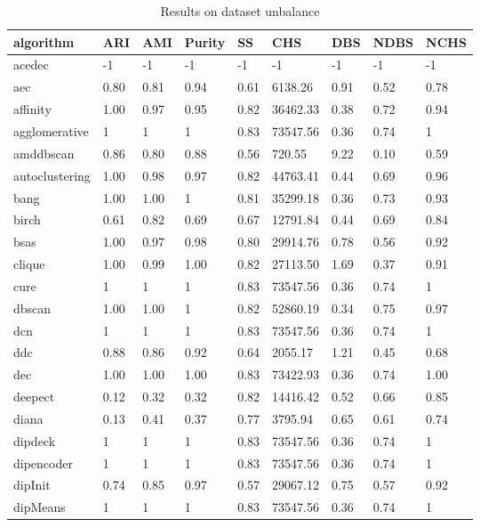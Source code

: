 \begin{table}[H]
\centering
\caption{Results on dataset unbalance}
\label{tab:params:unbalance}
\begin{tabular}{|l|l|l|l|l|l|l|l|l|}
\hline
algorithm & ARI & AMI & Purity & SS & CHS & DBS & NDBS & NCHS \\
\hline
acedec & -1 & -1 & -1 & -1 & -1 & -1 & -1 & -1 \\
\hline
aec & 0.80 & 0.81 & 0.94 & 0.61 & 6138.26 & 0.91 & 0.52 & 0.78 \\
\hline
affinity & 1.00 & 0.97 & 0.95 & 0.82 & 36462.33 & 0.38 & 0.72 & 0.94 \\
\hline
agglomerative & 1 & 1 & 1 & 0.83 & 73547.56 & 0.36 & 0.74 & 1 \\
\hline
amddbscan & 0.86 & 0.80 & 0.88 & 0.56 & 720.55 & 9.22 & 0.10 & 0.59 \\
\hline
autoclustering & 1.00 & 0.98 & 0.97 & 0.82 & 44763.41 & 0.44 & 0.69 & 0.96 \\
\hline
bang & 1.00 & 1.00 & 1 & 0.81 & 35299.18 & 0.36 & 0.73 & 0.93 \\
\hline
birch & 0.61 & 0.82 & 0.69 & 0.67 & 12791.84 & 0.44 & 0.69 & 0.84 \\
\hline
bsas & 1.00 & 0.97 & 0.98 & 0.80 & 29914.76 & 0.78 & 0.56 & 0.92 \\
\hline
clique & 1.00 & 0.99 & 1.00 & 0.82 & 27113.50 & 1.69 & 0.37 & 0.91 \\
\hline
cure & 1 & 1 & 1 & 0.83 & 73547.56 & 0.36 & 0.74 & 1 \\
\hline
dbscan & 1.00 & 1.00 & 1 & 0.82 & 52860.19 & 0.34 & 0.75 & 0.97 \\
\hline
dcn & 1 & 1 & 1 & 0.83 & 73547.56 & 0.36 & 0.74 & 1 \\
\hline
ddc & 0.88 & 0.86 & 0.92 & 0.64 & 2055.17 & 1.21 & 0.45 & 0.68 \\
\hline
dec & 1.00 & 1.00 & 1.00 & 0.83 & 73422.93 & 0.36 & 0.74 & 1.00 \\
\hline
deepect & 0.12 & 0.32 & 0.32 & 0.82 & 14416.42 & 0.52 & 0.66 & 0.85 \\
\hline
diana & 0.13 & 0.41 & 0.37 & 0.77 & 3795.94 & 0.65 & 0.61 & 0.74 \\
\hline
dipdeck & 1 & 1 & 1 & 0.83 & 73547.56 & 0.36 & 0.74 & 1 \\
\hline
dipencoder & 1 & 1 & 1 & 0.83 & 73547.56 & 0.36 & 0.74 & 1 \\
\hline
dipInit & 0.74 & 0.85 & 0.97 & 0.57 & 29067.12 & 0.75 & 0.57 & 0.92 \\
\hline
dipMeans & 1 & 1 & 1 & 0.83 & 73547.56 & 0.36 & 0.74 & 1 \\

\end{tabular}
\end{table}
